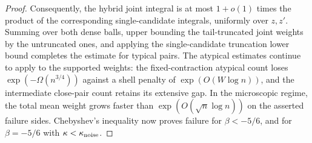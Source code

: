 \begin{proof}
Consequently, the hybrid joint integral is at most \(1+o(1)\) times the product of the corresponding single-candidate integrals, uniformly over \(z,z'\). Summing over both dense balls, upper bounding the tail-truncated joint weights by the untruncated ones, and applying the single-candidate truncation lower bound completes the estimate for typical pairs. The atypical estimates continue to apply to the supported weights: the fixed-contraction atypical count loses \(\exp(-\Omega(n^{3/4}))\) against a shell penalty of \(\exp(O(W\log n))\), and the intermediate close-pair count retains its extensive gap. In the microscopic regime, the total mean weight grows faster than \(\exp(O(\sqrt n\log n))\) on the asserted failure sides. Chebyshev's inequality now proves failure for \(\beta<-5/6\), and for \(\beta=-5/6\) with \(\kappa<\kappa_{\rm noise}\).
\end{proof}
